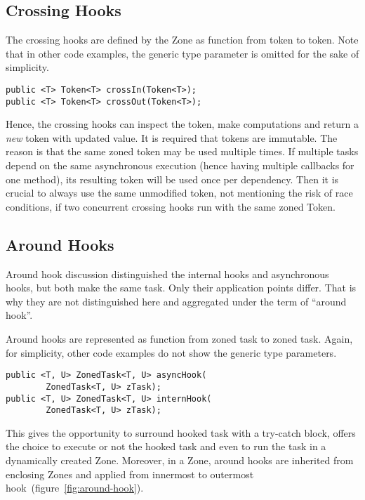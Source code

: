 \subsection*{Crossing Hooks}

The crossing hooks are defined by the Zone as function from token to token. Note that in other code examples, the generic type parameter is omitted for the sake of simplicity.

\begin{lstlisting}
public <T> Token<T> crossIn(Token<T>);
public <T> Token<T> crossOut(Token<T>);
\end{lstlisting}

Hence, the crossing hooks can inspect the token, make computations and return a \emph{new} token with updated value. It is required that tokens are immutable. The reason is that the same zoned token may be used multiple times. If multiple tasks depend on the same asynchronous execution (hence having multiple callbacks for one method), its resulting token will be used once per dependency. Then it is crucial to always use the same unmodified token, not mentioning the risk of race conditions, if two concurrent crossing hooks run with the same zoned Token.

\subsection*{Around Hooks}

Around hook discussion distinguished the internal hooks and asynchronous hooks, but both make the same task. Only their application points differ. That is why they are not distinguished here and aggregated under the term of ``around hook''.

Around hooks are represented as function from zoned task to zoned task. Again, for simplicity, other code examples do not show the generic type parameters.

\begin{lstlisting}
public <T, U> ZonedTask<T, U> asyncHook(
        ZonedTask<T, U> zTask);
public <T, U> ZonedTask<T, U> internHook(
        ZonedTask<T, U> zTask);
\end{lstlisting}

This gives the opportunity to surround hooked task with a try-catch block, offers the choice  to execute or not the hooked task and even to run the task in a dynamically created Zone. Moreover, in a Zone, around hooks are inherited from enclosing Zones and applied from innermost to outermost hook~(figure~\ref{fig:around-hook}).

